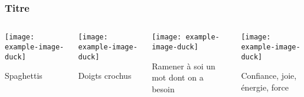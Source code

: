 \documentclass{beamer}
\begin{document}
\begin{frame}
  \frametitle{Titre}
  \begin{columns}[T,onlytextwidth]
    \begin{column}{.23\textwidth}
      \centering
      \texttt{[image: example-image-duck]}

      Spaghettis
    \end{column}
    \begin{column}{.23\textwidth}
      \centering
      \texttt{[image: example-image-duck]}

      Doigts crochus
    \end{column}
    \begin{column}{.23\textwidth}
      \centering
      \texttt{[image: example-image-duck]}

      Ramener à soi un mot dont on a besoin
    \end{column}
    \begin{column}{.23\textwidth}
      \centering
      \texttt{[image: example-image-duck]}

      Confiance, joie, énergie, force
    \end{column}
\end{columns}
\end{frame}
\end{document}
